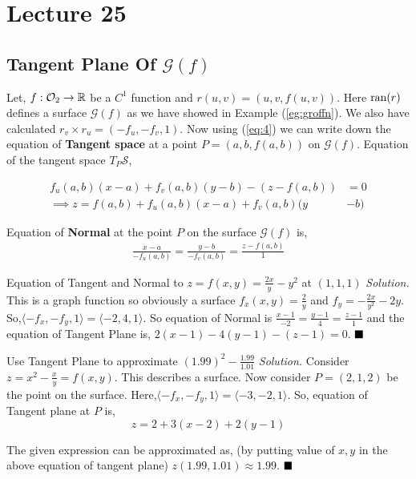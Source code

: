 \documentclass[../Analysis-3.tex]{subfiles}
\begin{document}
\chapter*{Lecture 25} %
\setcounter{chapter}{25} %
\setcounter{section}{0}
\section{Tangent Plane Of $\mathcal{G}(f)$}

Let, $f : \mathcal{O}_2 \to \mathbb{R}$ be a $C^1$ function and $r(u,v) = (u,v,f(u,v))$. Here $\operatorname{ran}(r)$ defines a surface $\mathcal{G}(f)$ as we have showed in Example (\ref{eg:groffn}). We also have calculated $r_v\times r_u = (-f_u,-f_v,1)$. Now using (\ref{eq:4}) we can write down the equation of \textbf{Tangent space} at a point $P = (a,b,f(a,b))$ on $\mathcal{G}(f)$. Equation of the tangent space $T_P \mathcal{S}$,

\begin{align}
  f_u(a,b)(x-a) + f_v(a,b)(y-b)-(z-f(a,b))         & = 0 \nonumber     \\
  \implies z = f(a,b) + f_u(a,b)(x-a) + f_v(a,b)(y & -b) \label{eq:tp}
\end{align}

Equation of \textbf{Normal} at the point $P$ on the surface $\mathcal{G}(f)$ is,
\begin{align}\label{eq:np}
  \frac{x-a}{-f_u(a,b)} = \frac{y-b}{-f_v(a,b)} = \frac{z-f(a,b)}{1}
\end{align}

\begin{Eg}{Equation of Tangent and Normal to $z = f(x,y) = \frac{2x}{y}-y^2$ at $(1,1,1)$}{}
  \textit{Solution.} This is a graph function so obviously a surface $f_x(x,y) = \frac{2}{y}$ and $f_y = -\frac{2x}{y^2} -2y$. So,$\langle -f_x,- f_y,1 \rangle = \langle -2,4,1\rangle$. So equation of Normal
  is $\frac{x-1}{-2}=\frac{y-1}{4}=\frac{z-1}{1}$ and the equation of Tangent Plane is,
  $ 2(x-1)-4(y-1) -(z-1) = 0$. $\hfill \blacksquare $
\end{Eg}
\begin{Eg}{Use Tangent Plane to approximate $(1.99)^2 - \frac{1.99}{1.01}$}{}
  \textit{Solution.} Consider $z = x^2 - \frac{x}{y} = f(x,y)$. This describes a surface. Now consider $P=(2,1,2)$ be the point on the surface. Here,$\langle -f_x,- f_y,1 \rangle = \langle -3,-2,1\rangle$. So, equation of Tangent plane at $P$ is, \[z = 2 +3(x-2) +2(y-1)\]

  The given expression can be approximated as, (by putting value of $x,y$ in the above equation of tangent plane) $z(1.99,1.01) \approx 1.99$. $\hfill \blacksquare$
\end{Eg}
\end{document}

